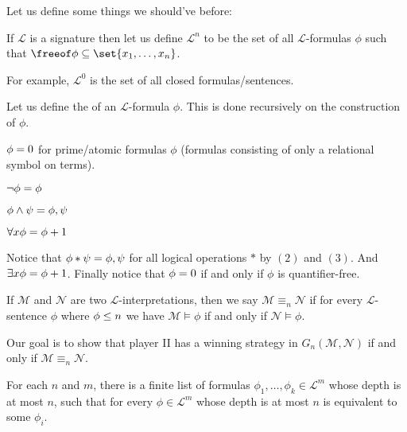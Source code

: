 \documentclass[10pt]{article}
\def\mL{\mathcal{L}}
\def\mM{\mathcal{M}}
\def\mN{\mathcal{N}}
\begin{document}
Let us define some things we should've before:

\begin{defn*}

    If $\mL$ is a signature then let us define $\mL^n$ to be the set of all $\mL$-formulas $\phi$ such that $\freeof\phi\subseteq\set{x_1,\dots,x_n}$.

\end{defn*}

For example, $\mL^0$ is the set of all closed formulas/sentences.

\begin{defn*}

    Let us define the  of an $\mL$-formula $\phi$.
    This is done recursively on the construction of $\phi$.
    \benum
        \item $\depthof\phi=0$ for prime/atomic formulas $\phi$ (formulas consisting of only a relational symbol on terms).
        \item $\depthof{\neg\phi}=\depthof\phi$
        \item $\depthof{\phi\land\psi}=\maxof{\depthof\phi,\depthof\psi}$
        \item $\depthof{\forall x\phi}=\depthof\phi+1$
    \eenum

\end{defn*}

Notice that $\depthof{\phi*\psi}=\maxof{\depthof\phi,\depthof\psi}$ for all logical operations $*$ by $(2)$ and $(3)$.
And $\depthof{\exists x\phi}=\depthof\phi+1$.
Finally notice that $\depthof\phi=0$ if and only if $\phi$ is quantifier-free.

\begin{defn*}

    If $\mM$ and $\mN$ are two $\mL$-interpretations, then we say $\mM\equiv_n\mN$ if for every $\mL$-sentence $\phi$ where $\depthof\phi\leq n$ we have $\mM\vDash\phi$ if and only if $\mN\vDash\phi$.

\end{defn*}


Our goal is to show that player II has a winning strategy in $G_n(\mM,\mN)$ if and only if $\mM\equiv_n\mN$.

\begin{lemm*}

    For each $n$ and $m$, there is a finite list of formulas $\phi_1,\dots,\phi_k\in\mL^m$ whose depth is at most $n$, such that for every $\phi\in\mL^m$ whose depth is at most $n$ is equivalent to some
    $\phi_i$.

\end{lemm*}
\end{document}
